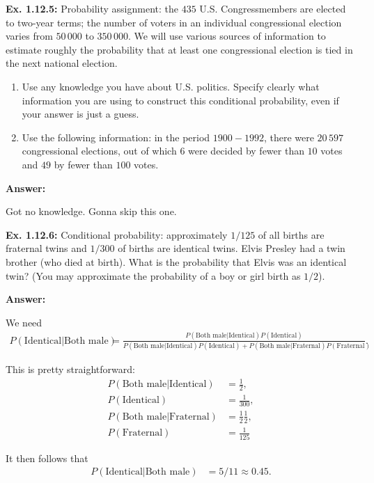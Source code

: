 \documentclass{article}
\begin{document}
\textbf{Ex. 1.12.5: }Probability assignment: the $435$ U.S. Congressmembers are elected to two-year terms; the number of voters in an individual congressional election varies from $50\,000$ to $350\,000$. We will use various sources of information to estimate roughly the probability that at least one congressional election is tied in the next national election.
\begin{enumerate}[label=\alph*]
	\item Use any knowledge you have about U.S. politics. Specify clearly what information you are using to construct this conditional probability, even if your answer is just a guess.
	\item Use the following information: in the period $1900-1992$, there were $20\,597$ congressional elections, out of which $6$ were decided by fewer than $10$ votes and $49$ by fewer than $100$ votes.
\end{enumerate}

\textbf{Answer:}

Got no knowledge. Gonna skip this one.

\textbf{Ex. 1.12.6: }Conditional probability: approximately $1/125$ of all births are fraternal twins and $1/300$ of births are identical twins. Elvis Presley had a twin brother (who died at birth). What is the probability that Elvis was an identical twin? (You may approximate the probability of a boy or girl birth as $1/2$).

\textbf{Answer:}

We need
\begin{align*}
	P(\text{Identical}|\text{Both male})&=\frac{P(\text{Both male}|\text{Identical})P(\text{Identical})}{P(\text{Both male}|\text{Identical})P(\text{Identical})+P(\text{Both male}|\text{Fraternal})P(\text{Fraternal})}.
\end{align*}

This is pretty straightforward:
\begin{align*}
	P(\text{Both male}|\text{Identical})&=\frac12,\\
	P(\text{Identical})&=\frac1{300},\\
	P(\text{Both male}|\text{Fraternal})&=\frac12\frac12,\\
	P(\text{Fraternal})&=\frac1{125}
\end{align*}

It then follows that
\begin{align*}
	P(\text{Identical}|\text{Both male})&=5/11\approx0.45.
\end{align*}
\end{document}
